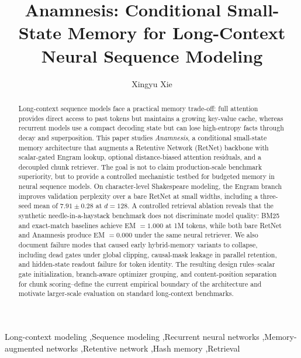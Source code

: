 \documentclass[preprint,12pt]{elsarticle}
\begin{document}
\begin{frontmatter}

\title{Anamnesis: Conditional Small-State Memory for Long-Context Neural Sequence Modeling}

\author[inst1]{Xingyu Xie}
\address[inst1]{Independent Researcher}

\begin{abstract}
Long-context sequence models face a practical memory trade-off: full attention provides direct access to past tokens but maintains a growing key-value cache, whereas recurrent models use a compact decoding state but can lose high-entropy facts through decay and superposition. This paper studies \emph{Anamnesis}, a conditional small-state memory architecture that augments a Retentive Network (RetNet) backbone with scalar-gated Engram lookup, optional distance-biased attention residuals, and a decoupled chunk retriever. The goal is not to claim production-scale benchmark superiority, but to provide a controlled mechanistic testbed for budgeted memory in neural sequence models. On character-level Shakespeare modeling, the Engram branch improves validation perplexity over a bare RetNet at small widths, including a three-seed mean of $7.91 \pm 0.28$ at $d=128$. A controlled retrieval ablation reveals that the synthetic needle-in-a-haystack benchmark does not discriminate model quality: BM25 and exact-match baselines achieve EM $= 1.000$ at 1M tokens, while both bare RetNet and Anamnesis produce EM $= 0.000$ under the same neural retriever. We also document failure modes that caused early hybrid-memory variants to collapse, including dead gates under global clipping, causal-mask leakage in parallel retention, and hidden-state readout failure for token identity. The resulting design rules--scalar gate initialization, branch-aware optimizer grouping, and content-position separation for chunk scoring--define the current empirical boundary of the architecture and motivate larger-scale evaluation on standard long-context benchmarks.
\end{abstract}

\begin{keyword}
Long-context modeling \sep Sequence modeling \sep Recurrent neural networks \sep Memory-augmented networks \sep Retentive network \sep Hash memory \sep Retrieval
\end{keyword}

\end{frontmatter}
\end{document}
